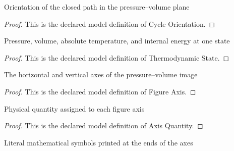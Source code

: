 \begin{definition}
  \label{def:physics:phyx-mini-0482:phyxminiproblems-problemphyxmini0482-cycleorientation}
  Orientation of the closed path in the pressure--volume plane
\end{definition}
\begin{proof}
  This is the declared model definition of Cycle Orientation.
\end{proof}
\begin{definition}
  \label{def:physics:phyx-mini-0482:phyxminiproblems-problemphyxmini0482-thermodynamicstate}
  Pressure, volume, absolute temperature, and internal energy at one state
\end{definition}
\begin{proof}
  This is the declared model definition of Thermodynamic State.
\end{proof}
\begin{definition}
  \label{def:physics:phyx-mini-0482:phyxminiproblems-problemphyxmini0482-figureaxis}
  The horizontal and vertical axes of the pressure--volume image
\end{definition}
\begin{proof}
  This is the declared model definition of Figure Axis.
\end{proof}
\begin{definition}
  \label{def:physics:phyx-mini-0482:phyxminiproblems-problemphyxmini0482-axisquantity}
  Physical quantity assigned to each figure axis
\end{definition}
\begin{proof}
  This is the declared model definition of Axis Quantity.
\end{proof}
\begin{definition}
  \label{def:physics:phyx-mini-0482:phyxminiproblems-problemphyxmini0482-axissymbol}
  Literal mathematical symbols printed at the ends of the axes
\end{definition}
